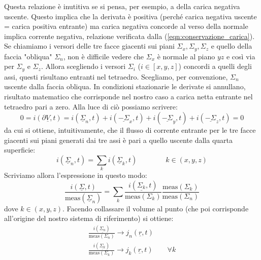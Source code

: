 \documentclass{book}
\begin{document}
        Questa relazione è inutitiva se si pensa, per esempio, a della carica negativa uscente. Questo implica che la derivata è positiva (perché carica negativa uscente = carica positiva entrante) ma carica negativa concorde al verso della normale implica corrente negativa, relazione verificata dalla (\ref{eqn:conservazione_carica}). \\
        Se chiamiamo i versori delle tre facce giacenti sui piani $\Sigma_{x}, \Sigma_{y}, \Sigma_{z}$ e quello della faccia "obliqua" $\Sigma_{n}$, non è difficile vedere che $\Sigma_{x}$ è normale al piano $yz$ e così via per $\Sigma_{y}$ e $\Sigma_{z}$. Allora scegliendo i versori $\Sigma_{i}$ ($i \in [x,y,z]$) concordi a quelli degli assi, questi risultano entranti nel tetraedro. Scegliamo, per convenzione, $\Sigma_{n}$ uscente dalla faccia obliqua. In condizioni stazionarie le derivate si annullano, risultato matematico che corrisponde nel nostro caso a carica netta entrante nel tetraedro pari a zero. Alla luce di ciò possiamo scrivere:
        \begin{equation}
            0 = i(\partial \underline{V}, t) = i(\underline{\Sigma}_{n}, t)+i(\underline{-\Sigma}_{x},t)+i(\underline{-\Sigma}_{y},t)+i(\underline{-\Sigma}_{z},t) = 0
        \end{equation}
        da cui si ottiene, intuitivamente, che il flusso di corrente entrante per le tre facce giacenti sui piani generati dai tre assi è pari a quello uscente dalla quarta superficie:
        \begin{equation}
            i(\underline{\Sigma}_{n}, t) = \sum_{k} i(\underline{\Sigma}_{k}, t) \qquad \qquad k \in (x,y,z)
        \end{equation}
        Scriviamo allora l'espressione in questo modo:
        \begin{equation}
            \frac{i(\underline{\Sigma}, t)}{\textrm{meas}(\underline{\Sigma}_{n})} = \sum_{k} \frac{i(\underline{\Sigma_{k}},t)}{\textrm{meas}(\Sigma_{k})} \frac{\textrm{meas}(\Sigma_{k})}{\textrm{meas}(\Sigma_{n})}
        \end{equation}
        dove $k \in (x,y,z)$. Facendo collassare il volume al punto (che poi corrisponde all'origine del nostro sistema di riferimento) si ottiene:
        \begin{align}
            \frac{i(\underline{\Sigma_{n}})}{\textrm{meas}(\Sigma_{n})} \to j_{n}(\underline{r},t) \\
            \frac{i(\underline{\Sigma_{k}})}{\textrm{meas}(\Sigma_{k})} \to j_{k}(\underline{r},t) \qquad \forall k
        \end{align}
\end{document}
